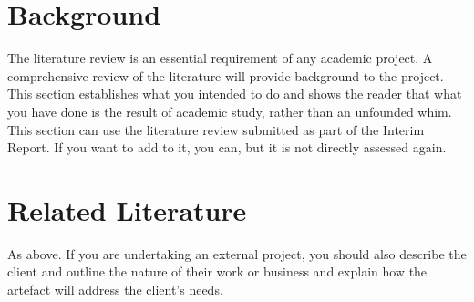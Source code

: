 \section{Background}
The literature review is an essential requirement of any academic project. A comprehensive review of the literature will provide background to the project. This section establishes what you intended to do and shows the reader that what you have done is the result of academic study, rather than an unfounded whim. This section can use the literature review submitted as part of the Interim Report. If you want to add to it, you can, but it is not directly assessed again.
\section{Related Literature}
As above. If you are undertaking an external project, you should also describe the client and outline the nature of their work or business and explain how the artefact will address the client’s needs.